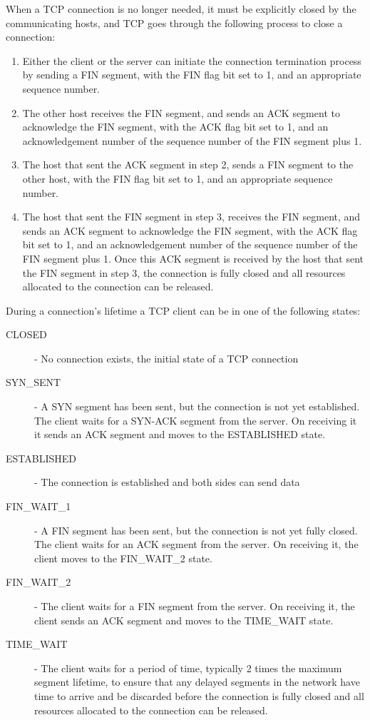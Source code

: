 \documentclass[12pt letter]{report}
\begin{document}
When a TCP connection is no longer needed, it must be explicitly closed by
the communicating hosts, and TCP goes through the following process to
close a connection:
\begin{enumerate}
  \item Either the client or the server can initiate the connection
    termination process
    by sending a FIN segment, with the FIN flag bit set to 1, and an
    appropriate sequence number.
  \item The other host receives the FIN segment, and sends an ACK
    segment to acknowledge the FIN segment, with the ACK flag bit set
    to 1, and an
    acknowledgement number of the sequence number of the FIN segment
    plus 1.
  \item The host that sent the ACK segment in step 2, sends a FIN segment to
    the other host, with the FIN flag bit set to 1, and an appropriate
    sequence number.
  \item  The host that sent the FIN segment in step 3, receives the FIN
    segment, and sends an ACK segment to acknowledge the FIN segment, with
    the ACK flag bit set to 1, and an acknowledgement number of the
    sequence number of the FIN segment plus 1. Once this ACK segment is
    received by the host that sent the FIN segment in step 3, the connection is
    fully closed and all resources allocated to the connection can be
    released.
\end{enumerate}

During a connection's lifetime a TCP client can be in one of the
following states:
\begin{description}
  \item[CLOSED]  - No connection exists, the initial state of a TCP connection
  \item[SYN\_SENT] - A SYN segment has been sent, but the connection is not yet
    established. The client waits for a SYN-ACK segment from the
    server. On receiving it it sends an ACK segment and moves to the
    ESTABLISHED state.
  \item[ESTABLISHED] - The connection is established and both sides
    can send data
  \item[FIN\_WAIT\_1] - A FIN segment has been sent, but the
    connection is not yet
    fully closed. The client waits for an ACK segment from the server. On
    receiving it, the client moves to the FIN\_WAIT\_2 state.
  \item[FIN\_WAIT\_2] - The client waits for a FIN segment from the server. On
    receiving it, the client sends an ACK segment and moves to the
    TIME\_WAIT state.
  \item[TIME\_WAIT] - The client waits for a period of time, typically
    2 times the maximum segment lifetime, to ensure that any delayed
    segments in the network have time to arrive and be discarded
    before the connection is fully closed and all resources allocated
    to the connection can be released.
\end{description}
\end{document}
